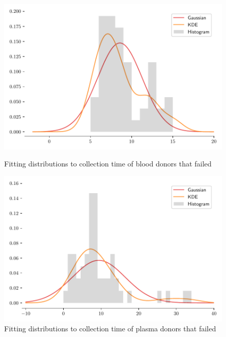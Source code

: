 \documentclass[a4paper,12pt]{article}
\begin{document}
\begin{figure}[H]
    \begin{minipage}[t]{0.5\textwidth}
        \centering
        \includegraphics[scale=0.48]{blood_failed_collection_time.pdf}
        \begin{minipage}[t]{0.9\textwidth}
            \centering
            \caption{Fitting distributions to collection time of blood donors that failed}
        \end{minipage}
    \end{minipage}%
    \begin{minipage}[t]{0.5\textwidth}
        \centering
        \includegraphics[scale=0.48]{plasma_failed_collection_time.pdf} %
        \begin{minipage}[t]{0.9\textwidth}
            \centering
            \caption{Fitting distributions to collection time of plasma donors that failed}
        \end{minipage}
    \end{minipage}
\end{figure}
\end{document}
